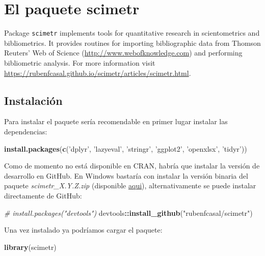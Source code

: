 \documentclass[]{book}
\newenvironment{Shaded}{\begin{snugshade}}{\end{snugshade}}
\newcommand{\KeywordTok}[1]{\textcolor[rgb]{0.13,0.29,0.53}{\textbf{#1}}}
\newcommand{\StringTok}[1]{\textcolor[rgb]{0.31,0.60,0.02}{#1}}
\newcommand{\CommentTok}[1]{\textcolor[rgb]{0.56,0.35,0.01}{\textit{#1}}}
\newcommand{\OperatorTok}[1]{\textcolor[rgb]{0.81,0.36,0.00}{\textbf{#1}}}
\newcommand{\NormalTok}[1]{#1}
\begin{document}
\chapter{El paquete scimetr}\label{scimetr}

Package \texttt{scimetr} implements tools for quantitative research in
scientometrics and bibliometrics. It provides routines for importing
bibliographic data from Thomson Reuters' Web of Science
(\url{http://www.webofknowledge.com}) and performing bibliometric
analysis. For more information visit
\url{https://rubenfcasal.github.io/scimetr/articles/scimetr.html}.

\section{Instalación}\label{instalaciuxf3n}

Para instalar el paquete sería recomendable en primer lugar instalar las
dependencias:

\begin{Shaded}
\begin{Highlighting}[]
\KeywordTok{install.packages}\NormalTok{(}\KeywordTok{c}\NormalTok{(}\StringTok{'dplyr'}\NormalTok{, }\StringTok{'lazyeval'}\NormalTok{, }\StringTok{'stringr'}\NormalTok{, }\StringTok{'ggplot2'}\NormalTok{, }\StringTok{'openxlsx'}\NormalTok{, }\StringTok{'tidyr'}\NormalTok{))}
\end{Highlighting}
\end{Shaded}

Como de momento no está disponible en CRAN, habría que instalar la
versión de desarrollo en GitHub. En Windows bastaría con instalar la
versión binaria del paquete \emph{scimetr\_X.Y.Z.zip} (disponible
\href{https://github.com/rubenfcasal/scimetr/tree/master/docs}{aqui}),
alternativamente se puede instalar directamente de GitHub:

\begin{Shaded}
\begin{Highlighting}[]
\CommentTok{# install.packages("devtools")}
\NormalTok{devtools}\OperatorTok{::}\KeywordTok{install_github}\NormalTok{(}\StringTok{"rubenfcasal/scimetr"}\NormalTok{)}
\end{Highlighting}
\end{Shaded}

Una vez instalado ya podríamos cargar el paquete:

\begin{Shaded}
\begin{Highlighting}[]
\KeywordTok{library}\NormalTok{(scimetr)}
\end{Highlighting}
\end{Shaded}
\end{document}
